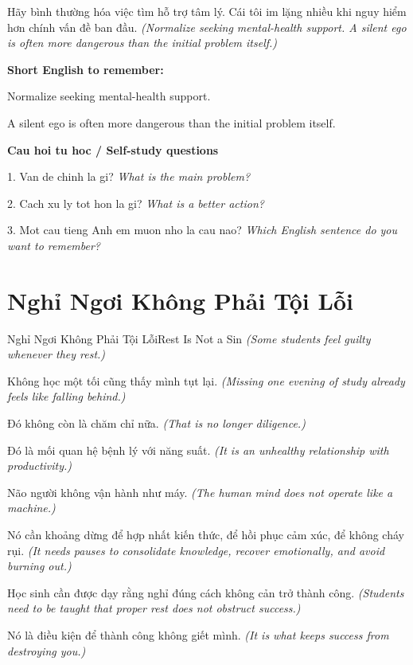 \begin{baihoc}
Hãy bình thường hóa việc tìm hỗ trợ tâm lý. Cái tôi im lặng nhiều khi nguy hiểm hơn chính vấn đề ban đầu.
\textit{(Normalize seeking mental-health support. A silent ego is often more dangerous than the initial problem itself.)}
\end{baihoc}

\begin{ghinhoanh}
\textbf{Short English to remember:}

Normalize seeking mental-health support.

A silent ego is often more dangerous than the initial problem itself.

\end{ghinhoanh}

\begin{tuhocnhanh}
\textbf{Cau hoi tu hoc / Self-study questions}

1. Van de chinh la gi? \textit{What is the main problem?}

2. Cach xu ly tot hon la gi? \textit{What is a better action?}

3. Mot cau tieng Anh em muon nho la cau nao? \textit{Which English sentence do you want to remember?}
\end{tuhocnhanh}
\ngancach

\section{Nghỉ Ngơi Không Phải Tội Lỗi}
\begin{truyen}{Nghỉ Ngơi Không Phải Tội Lỗi}{Rest Is Not a Sin}
\textit{(Some students feel guilty whenever they rest.)}

Không học một tối cũng thấy mình tụt lại.
\textit{(Missing one evening of study already feels like falling behind.)}

Đó không còn là chăm chỉ nữa.
\textit{(That is no longer diligence.)}

Đó là mối quan hệ bệnh lý với năng suất.
\textit{(It is an unhealthy relationship with productivity.)}

Não người không vận hành như máy.
\textit{(The human mind does not operate like a machine.)}

Nó cần khoảng dừng để hợp nhất kiến thức, để hồi phục cảm xúc, để không cháy rụi.
\textit{(It needs pauses to consolidate knowledge, recover emotionally, and avoid burning out.)}

Học sinh cần được dạy rằng nghỉ đúng cách không cản trở thành công.
\textit{(Students need to be taught that proper rest does not obstruct success.)}

Nó là điều kiện để thành công không giết mình.
\textit{(It is what keeps success from destroying you.)}

\end{truyen}

